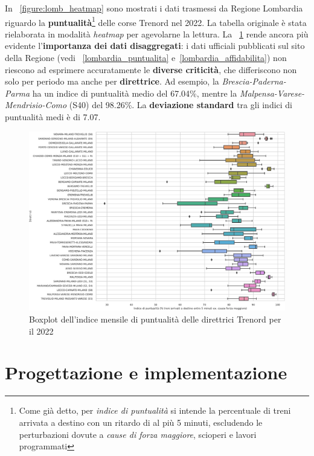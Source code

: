 \documentclass[12pt,a4paper,italian]{report}
\begin{document}
In \figurename~\ref{figure:lomb_heatmap} sono mostrati i dati trasmessi da Regione Lombardia
riguardo la \textbf{puntualità}\footnote{Come già detto, per
    \textit{indice di puntualità} si intende la percentuale di treni
    arrivata a destino con un ritardo di al più 5 minuti, escludendo
    le perturbazioni dovute a \textit{cause di forza maggiore},
    scioperi e lavori programmati} delle corse Trenord nel 2022.  La
tabella originale è stata rielaborata in modalità \textit{heatmap} per
agevolarne la lettura.  La \figurename~\ref{figure:lomb_boxplot} rende
ancora più evidente l'\textbf{importanza dei dati disaggregati}: i
dati ufficiali pubblicati sul sito della Regione (vedi
\figurename~\ref{lombardia_puntualita} e~\ref{lombardia_affidabilita})
non riescono ad esprimere accuratamente le \textbf{diverse criticità},
che differiscono non solo per periodo ma anche per
\textbf{direttrice}.  Ad esempio, la \textit{Brescia-Paderna-Parma} ha
un indice di puntualità medio del 67.04\%, mentre la
\textit{Malpensa-Varese-Mendrisio-Como} (S40) del 98.26\%.  La
\textbf{deviazione standard} tra gli indici di puntualità medi è di
7.07.

\begin{figure}
    \centering
    \includegraphics[width=1\textwidth]{images/lomb_boxplot.pdf}
    \caption{Boxplot dell'indice mensile di puntualità delle
        direttrici Trenord per il 2022}
    \label{figure:lomb_boxplot}
\end{figure}

\chapter{Progettazione e implementazione}
\label{progettazione}
\end{document}
